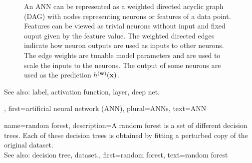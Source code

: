 {{{\begin{figure}[H]
 			\caption{An ANN can be represented as a weighted directed acyclic graph (DAG) with 
			nodes representing neurons or features of a data point. Features 
			can be viewed as trivial neurons without input and fixed ouput given by the 
			feature value. The weighted directed edges indicate how neuron outputs are used 
			as inputs to other neurons. The edge weights are tunable model parameters and are 
			used to scale the inputs to the neurons. The output of some neurons are used as the 
			prediction $h^{({\bf w})}({\bf x})$. \label{fig_ANN_DAG_dict}}
 			\end{figure}

		See also: label, activation function, layer, deep net.},
	first={artificial neural network (ANN)},
	plural={ANNs},
	text={ANN}
}


{name={random forest},
	description={A random forest is a set of different decision trees. 
		Each of these decision trees is obtained by fitting a perturbed copy of 
		the original dataset.
				\\
		See also: decision tree, dataset.},
	first={random forest}, 
	text={random forest}
}


}
